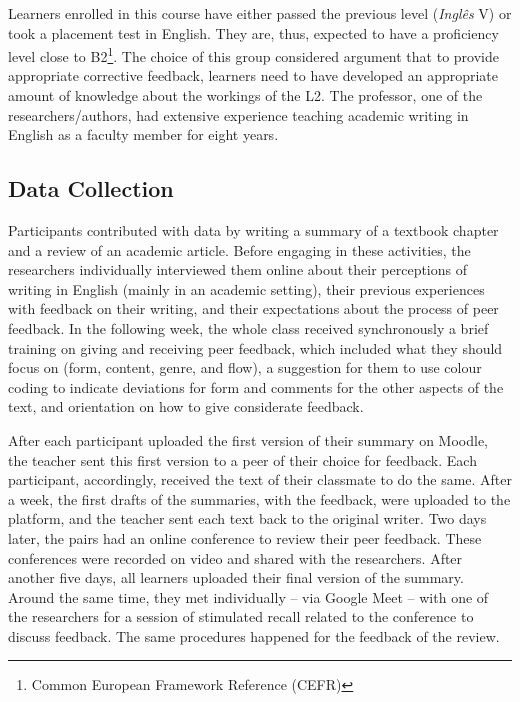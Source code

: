 \documentclass[english]{textolivre}
\begin{document}
Learners enrolled in this course have either passed the previous level (\emph{Inglês} V) or took a placement test in English. They are, thus, expected to have a proficiency level close to B2\footnote{Common European Framework Reference (CEFR)}. The choice of this group considered \textcite{lyster2013oral} argument that to provide appropriate corrective feedback, learners need to have developed an appropriate amount of knowledge about the workings of the L2. The professor, one of the researchers/authors, had extensive experience teaching academic writing in English as a faculty member for eight years.


\subsection{Data Collection}

Participants contributed with data by writing a summary of a textbook chapter and a review of an academic article. Before engaging in these activities, the researchers individually interviewed them online about their perceptions of writing in English (mainly in an academic setting), their previous experiences with feedback on their writing, and their expectations about the process of peer feedback. In the following week, the whole class received synchronously a brief training on giving and receiving peer feedback, which included what they should focus on (form, content, genre, and flow), a suggestion for them to use colour coding to indicate deviations for form and comments for the other aspects of the text, and orientation on how to give considerate feedback.

After each participant uploaded the first version of their summary on Moodle, the teacher sent this first version to a peer of their choice for feedback. Each participant, accordingly, received the text of their classmate to do the same. After a week, the first drafts of the summaries, with the feedback, were uploaded to the platform, and the teacher sent each text back to the original writer. Two days later, the pairs had an online conference to review their peer feedback. These conferences were recorded on video and shared with the researchers. After another five days, all learners uploaded their final version of the summary. Around the same time, they met individually – via Google Meet – with one of the researchers for a session of stimulated recall related to the conference to discuss feedback. The same procedures happened for the feedback of the review.
\end{document}

